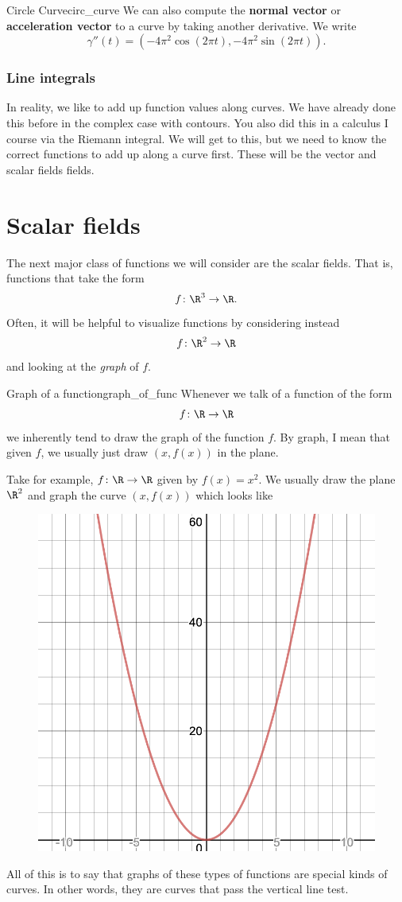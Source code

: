 \begin{ex}{Circle Curve}{circ_curve}
        We can also compute the \textbf{normal vector} or \textbf{acceleration vector} to a curve by taking another derivative.  We write
        \[
        \gamma''(t)=(-4\pi^2 \cos(2\pi t),-4\pi^2 \sin(2\pi t)).
        \]
        \end{ex}
        
        \subsubsection{Line integrals}
        
        In reality, we like to add up function values along curves.  We have already done this before in the complex case with contours.  You also did this in a calculus I course via the Riemann integral.  We will get to this, but we need to know the correct functions to add up along a curve first. These will be the vector and scalar fields fields.
        
        
        
        \section{Scalar fields}
        The next major class of functions we will consider are the scalar fields.  That is, functions that take the form
        \[
        f\colon \R^3 \to \R.
        \]
        Often, it will be helpful to visualize functions by considering instead
        \[
        f\colon \R^2 \to \R
        \]
        and looking at the \emph{graph} of $f$.  
        
        \begin{ex}{Graph of a function}{graph_of_func}
        Whenever we talk of a function of the form
        \[
        f\colon \R \to \R
        \]
        we inherently tend to draw the graph of the function $f$.  By graph, I mean that given $f$, we usually just draw $(x,f(x))$ in the plane.
        
        Take for example, $f\colon \R \to \R$ given by $f(x)=x^2$.  We usually draw the plane $\R^2$ and graph the curve $(x,f(x))$ which looks like
        \begin{figure}[H]
            \centering
            \includegraphics[width=.5\textwidth]{Figures/quadratic_curve.png}           
        \end{figure}
        All of this is to say that graphs of these types of functions are special kinds of curves.  In other words, they are curves that pass the vertical line test.
        \end{ex}
        
